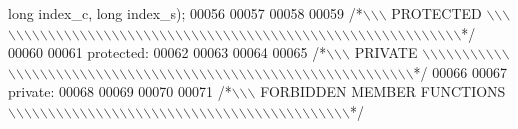 \begin{DoxyCode}
{      long} index\_c, \textcolor{keywordtype}{long} index\_s);
00056 
00057 
00058 
00059 \textcolor{comment}{/*\(\backslash\)\(\backslash\)\(\backslash\) PROTECTED \(\backslash\)\(\backslash\)\(\backslash\)\(\backslash\)\(\backslash\)\(\backslash\)\(\backslash\)\(\backslash\)\(\backslash\)\(\backslash\)\(\backslash\)\(\backslash\)\(\backslash\)\(\backslash\)\(\backslash\)\(\backslash\)\(\backslash\)\(\backslash\)\(\backslash\)\(\backslash\)\(\backslash\)\(\backslash\)\(\backslash\)\(\backslash\)\(\backslash\)\(\backslash\)\(\backslash\)\(\backslash\)\(\backslash\)\(\backslash\)\(\backslash\)\(\backslash\)\(\backslash\)\(\backslash\)\(\backslash\)\(\backslash\)\(\backslash\)\(\backslash\)\(\backslash\)\(\backslash\)\(\backslash\)\(\backslash\)\(\backslash\)\(\backslash\)\(\backslash\)\(\backslash\)\(\backslash\)\(\backslash\)\(\backslash\)\(\backslash\)\(\backslash\)\(\backslash\)\(\backslash\)\(\backslash\)\(\backslash\)\(\backslash\)\(\backslash\)\(\backslash\)\(\backslash\)\(\backslash\)*/}
00060 
00061 \textcolor{keyword}{protected}:
00062 
00063 
00064 
00065 \textcolor{comment}{/*\(\backslash\)\(\backslash\)\(\backslash\) PRIVATE \(\backslash\)\(\backslash\)\(\backslash\)\(\backslash\)\(\backslash\)\(\backslash\)\(\backslash\)\(\backslash\)\(\backslash\)\(\backslash\)\(\backslash\)\(\backslash\)\(\backslash\)\(\backslash\)\(\backslash\)\(\backslash\)\(\backslash\)\(\backslash\)\(\backslash\)\(\backslash\)\(\backslash\)\(\backslash\)\(\backslash\)\(\backslash\)\(\backslash\)\(\backslash\)\(\backslash\)\(\backslash\)\(\backslash\)\(\backslash\)\(\backslash\)\(\backslash\)\(\backslash\)\(\backslash\)\(\backslash\)\(\backslash\)\(\backslash\)\(\backslash\)\(\backslash\)\(\backslash\)\(\backslash\)\(\backslash\)\(\backslash\)\(\backslash\)\(\backslash\)\(\backslash\)\(\backslash\)\(\backslash\)\(\backslash\)\(\backslash\)\(\backslash\)\(\backslash\)\(\backslash\)\(\backslash\)\(\backslash\)\(\backslash\)\(\backslash\)\(\backslash\)\(\backslash\)\(\backslash\)\(\backslash\)\(\backslash\)*/}
00066 
00067 \textcolor{keyword}{private}:
00068 
00069 
00070 
00071 \textcolor{comment}{/*\(\backslash\)\(\backslash\)\(\backslash\) FORBIDDEN MEMBER FUNCTIONS \(\backslash\)\(\backslash\)\(\backslash\)\(\backslash\)\(\backslash\)\(\backslash\)\(\backslash\)\(\backslash\)\(\backslash\)\(\backslash\)\(\backslash\)\(\backslash\)\(\backslash\)\(\backslash\)\(\backslash\)\(\backslash\)\(\backslash\)\(\backslash\)\(\backslash\)\(\backslash\)\(\backslash\)\(\backslash\)\(\backslash\)\(\backslash\)\(\backslash\)\(\backslash\)\(\backslash\)\(\backslash\)\(\backslash\)\(\backslash\)\(\backslash\)\(\backslash\)\(\backslash\)\(\backslash\)\(\backslash\)\(\backslash\)\(\backslash\)\(\backslash\)\(\backslash\)\(\backslash\)\(\backslash\)\(\backslash\)\(\backslash\)*/}

\end{DoxyCode}
